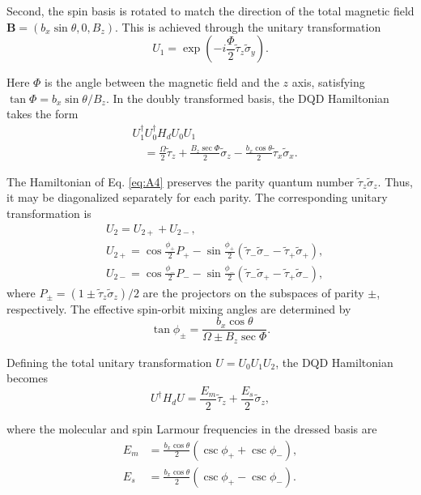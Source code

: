 \documentclass[12pt]{article}
\begin{document}
Second, the spin basis is rotated to match the direction of the total magnetic field $\mathbf{B}=\left(b_x \sin \theta, 0, B_z\right)$. This is achieved through the unitary transformation
\begin{equation}
    U_1=\exp \left(-i \frac{\Phi}{2} \widetilde{\tau}_z \widetilde{\sigma}_y\right) .    
\end{equation}


Here $\Phi$ is the angle between the magnetic field and the $z$ axis, satisfying $\tan \Phi=b_x \sin \theta / B_z$. In the doubly transformed basis, the DQD Hamiltonian takes the form
\begin{equation}\label{eq:A4}
    \begin{aligned}
        & U_1^{\dagger} U_0^{\dagger} H_d U_0 U_1 \\
        & \quad=\frac{\Omega}{2} \widetilde{\tau}_z+\frac{B_z \sec \Phi}{2} \widetilde{\sigma}_z-\frac{b_x \cos \theta}{2} \widetilde{\tau}_x \widetilde{\sigma}_x .
    \end{aligned}
\end{equation}

The Hamiltonian of Eq. \ref{eq:A4} preserves the parity quantum number $\tilde{\tau}_z \tilde{\sigma}_z$. Thus, it may be diagonalized separately for each parity. The corresponding unitary transformation is
$$
\begin{aligned}
& U_2=U_{2+}+U_{2-}, \\
& U_{2+}=\cos \frac{\phi_{+}}{2} P_{+}-\sin \frac{\phi_{+}}{2}\left(\tilde{\tau}_{-} \tilde{\sigma}_{-}-\tilde{\tau}_{+} \tilde{\sigma}_{+}\right), \\
& U_{2-}=\cos \frac{\phi_{-}}{2} P_{-}-\sin \frac{\phi_{-}}{2}\left(\tilde{\tau}_{-} \tilde{\sigma}_{+}-\tilde{\tau}_{+} \tilde{\sigma}_{-}\right),
\end{aligned}
$$
where $P_{ \pm}=\left(1 \pm \tilde{\tau}_z \widetilde{\sigma}_z\right) / 2$ are the projectors on the subspaces of parity $\pm$, respectively. The effective spin-orbit mixing angles are determined by
$$
\tan \phi_{ \pm}=\frac{b_x \cos \theta}{\Omega \pm B_z \sec \Phi} .
$$

Defining the total unitary transformation $U=U_0 U_1 U_2$, the DQD Hamiltonian becomes
\begin{equation}\label{eq:A7}
    U^{\dagger} H_d U=\frac{E_m}{2} \widetilde{\tau}_z+\frac{E_s}{2} \widetilde{\sigma}_z,
\end{equation}

where the molecular and spin Larmour frequencies in the dressed basis are
\begin{equation}\label{eq:A8}
    \begin{aligned}
        E_m & =\frac{b_x \cos \theta}{2}\left(\csc \phi_{+}+\csc \phi_{-}\right), \\
        E_s & =\frac{b_x \cos \theta}{2}\left(\csc \phi_{+}-\csc \phi_{-}\right) .
        \end{aligned}
\end{equation}
\end{document}
